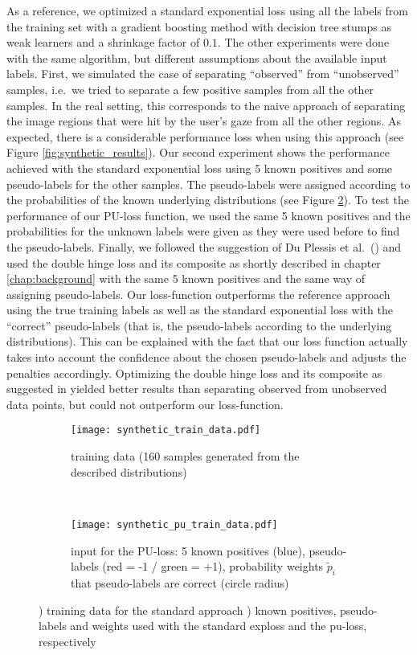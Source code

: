 As a reference, we optimized a standard exponential loss using all the labels from the training set with a gradient boosting method with decision tree stumps as weak learners and a shrinkage factor of $0.1.$ 
The other experiments were done with the same algorithm, but different assumptions about the available input labels. 
First, we simulated the case of separating ``observed'' from ``unobserved'' samples, i.e.\ we tried to separate a few positive samples from all the other samples. 
In the real setting, this corresponds to the naive approach of separating the image regions that were hit by the user's gaze from all the other regions. 
As expected, there is a considerable performance loss when using this approach (see Figure \ref{fig:synthetic_results}). 
Our second experiment shows the performance achieved with the standard exponential loss using 5 known positives and some pseudo-labels for the other samples. 
The pseudo-labels were assigned according to the probabilities of the known underlying distributions (see Figure \ref{subfig:pu_train}). 
To test the performance of our PU-loss function, we used the same 5 known positives and the probabilities for the unknown labels were given as they were used before to find the pseudo-labels. 
Finally, we followed the suggestion of Du Plessis et al.\ (\cite{plessis2015convex}) and used the double hinge loss and its composite as shortly described in chapter \ref{chap:background} with the same 5 known positives and the same way of assigning pseudo-labels.
Our loss-function outperforms the reference approach using the true training labels as well as the standard exponential loss with the ``correct'' pseudo-labels (that is, the pseudo-labels according to the underlying distributions). 
This can be explained with the fact that our loss function actually takes into account the confidence about the chosen pseudo-labels and adjusts the penalties accordingly. 
Optimizing the double hinge loss and its composite as suggested in \cite{plessis2015convex} yielded better results than separating observed from unobserved data points, but could not outperform our loss-function. 

\begin{figure}[ht]
	\centering
	\begin{subfigure}[h]{0.49\textwidth}
	\texttt{[image: synthetic\_train\_data.pdf]}	
		\caption{training data (160 samples generated from the described distributions)\newline}
		\label{subfig:ref_train}
	\end{subfigure}
	~
	\begin{subfigure}[h]{0.49\textwidth}
	\texttt{[image: synthetic\_pu\_train\_data.pdf]}	
		\caption{input for the PU-loss: 5 known positives (blue), pseudo-labels (red = -1 / green = +1), probability weights $\tilde p_i$ that pseudo-labels are correct (circle radius)}
		\label{subfig:pu_train}
	\end{subfigure}
	\caption{) training data for the standard approach ) known positives, pseudo-labels and weights used with the standard exploss and the pu-loss, respectively}
	\label{fig:synthetic_train_data}
\end{figure}

